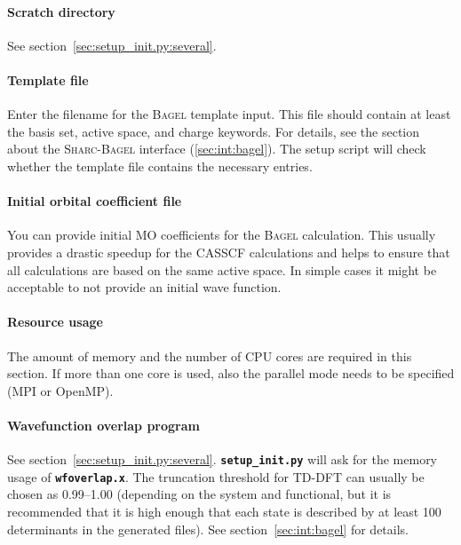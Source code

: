 \documentclass[a4paper,10pt,DIV=15,openany]{scrbook}
\newcommand{\sharc}{\textsc{Sharc}}
\newcommand{\ttt}[1]{\textbf{\texttt{#1}}}
\begin{document}
\paragraph{Scratch directory}

See section~\ref{sec:setup_init.py:several}.

\paragraph{Template file}

Enter the filename for the \textsc{Bagel} template input. This file should contain at least the basis set, active space, and charge keywords. For details, see the section about the \sharc-\textsc{Bagel} interface (\ref{sec:int:bagel}). The setup script will check whether the template file contains the necessary entries. 

\paragraph{Initial orbital coefficient file}

You can provide initial MO coefficients for the \textsc{Bagel} calculation. This usually provides a drastic speedup for the CASSCF calculations and helps to ensure that all calculations are based on the same active space. In simple cases it might be acceptable to not provide an initial wave function.

\paragraph{Resource usage}

The amount of memory and the number of CPU cores are required in this section. If more than one core is used, also the parallel mode needs to be specified (MPI or OpenMP).


\paragraph{Wavefunction overlap program}

See section~\ref{sec:setup_init.py:several}. \ttt{setup\_init.py} will ask for the memory usage of \ttt{wfoverlap.x}. The truncation threshold for TD-DFT can usually be chosen as 0.99--1.00 (depending on the system and functional, but it is recommended that it is high enough that each state is described by at least 100 determinants in the generated files). See section~\ref{sec:int:bagel} for details.
\end{document}
